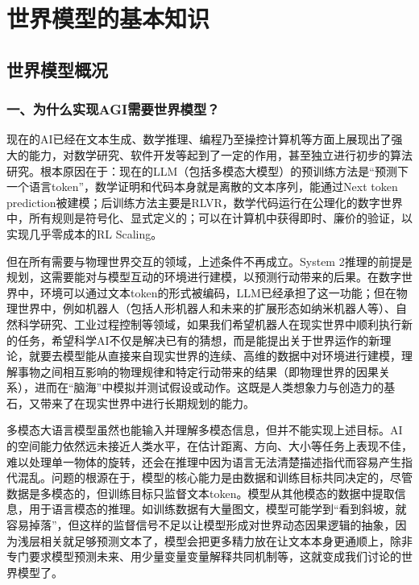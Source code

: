 \hypertarget{ux4e16ux754cux6a21ux578bux7684ux57faux672cux77e5ux8bc6}{%
\chapter{世界模型的基本知识}\label{ux4e16ux754cux6a21ux578bux7684ux57faux672cux77e5ux8bc6}}

\hypertarget{ux4e16ux754cux6a21ux578bux6982ux51b5}{%
\section{世界模型概况}\label{ux4e16ux754cux6a21ux578bux6982ux51b5}}

\hypertarget{ux4e00ux4e3aux4ec0ux4e48ux5b9eux73b0agiux9700ux8981ux4e16ux754cux6a21ux578b}{%
\subsection{一、为什么实现AGI需要世界模型？}\label{ux4e00ux4e3aux4ec0ux4e48ux5b9eux73b0agiux9700ux8981ux4e16ux754cux6a21ux578b}}

现在的AI已经在文本生成、数学推理、编程乃至操控计算机等方面上展现出了强大的能力，对数学研究、软件开发等起到了一定的作用，甚至独立进行初步的算法研究。根本原因在于：现在的LLM（包括多模态大模型）的预训练方法是``预测下一个语言token''，数学证明和代码本身就是离散的文本序列，能通过Next token prediction被建模；后训练方法主要是RLVR，数学代码运行在公理化的数字世界中，所有规则是符号化、显式定义的；可以在计算机中获得即时、廉价的验证，以实现几乎零成本的RL Scaling。

但在所有需要与物理世界交互的领域，上述条件不再成立。System 2推理的前提是规划，这需要能对与模型互动的环境进行建模，以预测行动带来的后果。在数字世界中，环境可以通过文本token的形式被编码，LLM已经承担了这一功能；但在物理世界中，例如机器人（包括人形机器人和未来的扩展形态如纳米机器人等）、自然科学研究、工业过程控制等领域，如果我们希望机器人在现实世界中顺利执行新的任务，希望科学AI不仅是解决已有的猜想，而是能提出关于世界运作的新理论，就要去模型能从直接来自现实世界的连续、高维的数据中对环境进行建模，理解事物之间相互影响的物理规律和特定行动带来的结果（即物理世界的因果关系），进而在``脑海''中模拟并测试假设或动作。这既是人类想象力与创造力的基石，又带来了在现实世界中进行长期规划的能力。

多模态大语言模型虽然也能输入并理解多模态信息，但并不能实现上述目标。AI的空间能力依然远未接近人类水平，在估计距离、方向、大小等任务上表现不佳，难以处理单一物体的旋转，还会在推理中因为语言无法清楚描述指代而容易产生指代混乱。问题的根源在于，模型的核心能力是由数据和训练目标共同决定的，尽管数据是多模态的，但训练目标只监督文本token。模型从其他模态的数据中提取信息，用于语言模态的推理。如训练数据有大量图文，模型可能学到``看到斜坡，就容易掉落''，但这样的监督信号不足以让模型形成对世界动态因果逻辑的抽象，因为浅层相关就足够预测文本了，模型会把更多精力放在让文本本身更通顺上，除非专门要求模型预测未来、用少量变量变量解释共同机制等，这就变成我们讨论的世界模型了。

